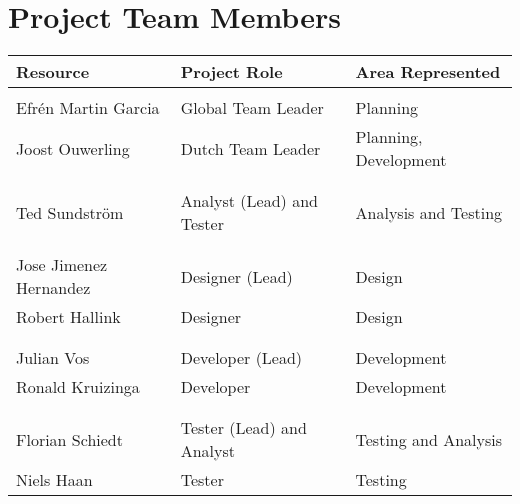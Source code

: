 \clearpage

\section{Project Team Members}

\begin{table}[h]
\begin{tabular}{lll}
\textbf{Resource} & \textbf{Project Role} & \textbf{Area Represented} \\  \hline \\

Efrén Martin Garcia & Global Team Leader & Planning \\
Joost Ouwerling & Dutch Team Leader & Planning, Development \\ \\
\hdashline \\
Ted Sundström & Analyst (Lead) and Tester & Analysis and Testing\\ \\
\hdashline \\
Jose Jimenez	Hernandez & Designer (Lead) & Design \\
Robert Hallink & Designer & Design \\ \\
\hdashline \\
Julian Vos & Developer (Lead) & Development \\
Ronald Kruizinga & Developer & Development \\ \\
\hdashline \\
Florian Schiedt & Tester (Lead) and Analyst & Testing and Analysis \\
Niels Haan & Tester & Testing

\end{tabular}
\end{table}
